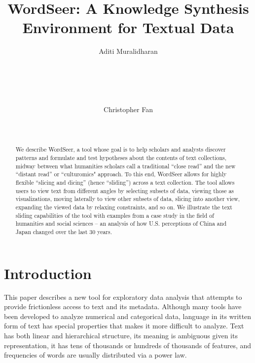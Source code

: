 \documentclass{sig-alternate}
\begin{document}
\title{WordSeer: A Knowledge Synthesis Environment for Textual Data}

\author{%
\alignauthor Aditi Muralidharan\\
       \\
       \\
\\
       \\
       \\
\alignauthor Christopher Fan\\
       \\
       \\
}

\maketitle

\begin{abstract}

We describe WordSeer, a tool whose goal is to help scholars and analysts discover patterns and formulate and test hypotheses about the contents of  text collections, midway between what  humanities scholars call a traditional  ``close read'' and the new ``distant read'' or  ``culturomics" approach.  
To this end, WordSeer allows for highly flexible  ``slicing and dicing'' (hence  ``sliding'') across a text collection.  The tool allows users to view text from different angles by selecting subsets of data, viewing those as visualizations, moving laterally to view other subsets of data, slicing into another view, expanding the viewed data by relaxing constraints, and so on.  We illustrate the text sliding capabilities of the tool with examples from a case study in the field of humanities and social sciences -- an analysis of how U.S. perceptions of China and Japan  changed over the last 30 years.

\end{abstract}

\section{Introduction}
This paper describes a new tool for exploratory data analysis \cite{tukey1977exploratory} that attempts to provide frictionless access to text and its metadata.  Although many tools have been developed to analyze numerical and categorical data, language in its written form of text has special properties that makes it more difficult to analyze. Text has both linear and hierarchical structure, its meaning is ambiguous given its representation, it has tens of thousands or hundreds of thousands of features, and frequencies of words are usually distributed via a power law.  
\end{document}
